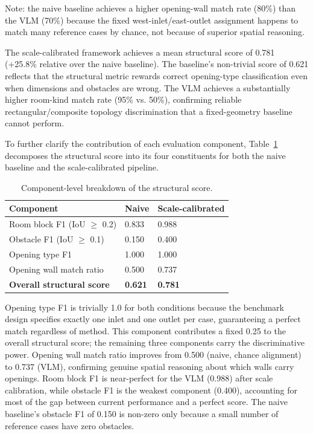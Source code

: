 \documentclass[preprint,12pt,number]{elsarticle}
\begin{document}
Note: the naive baseline achieves a higher opening-wall match rate (80\%) than the VLM (70\%) because the fixed west-inlet/east-outlet assignment happens to match many reference cases by chance, not because of superior spatial reasoning.

The scale-calibrated framework achieves a mean structural score of 0.781 (+25.8\% relative over the naive baseline). The baseline's non-trivial score of 0.621 reflects that the structural metric rewards correct opening-type classification even when dimensions and obstacles are wrong. The VLM achieves a substantially higher room-kind match rate (95\% vs. 50\%), confirming reliable rectangular/composite topology discrimination that a fixed-geometry baseline cannot perform.

To further clarify the contribution of each evaluation component, Table~\ref{tab:result-component-breakdown} decomposes the structural score into its four constituents for both the naive baseline and the scale-calibrated pipeline.

\begin{table}[htbp]
\centering
\caption{Component-level breakdown of the structural score.}
\label{tab:result-component-breakdown}
\begin{tabular}{lll}
\toprule
Component & Naive & Scale-calibrated \\
\midrule
Room block F1 (IoU $\geq$ 0.2) & 0.833 & 0.988 \\
Obstacle F1 (IoU $\geq$ 0.1) & 0.150 & 0.400 \\
Opening type F1 & 1.000 & 1.000 \\
Opening wall match ratio & 0.500 & 0.737 \\
\textbf{Overall structural score} & \textbf{0.621} & \textbf{0.781} \\
\bottomrule
\end{tabular}
\end{table}


Opening type F1 is trivially 1.0 for both conditions because the benchmark design specifies exactly one inlet and one outlet per case, guaranteeing a perfect match regardless of method. This component contributes a fixed 0.25 to the overall structural score; the remaining three components carry the discriminative power. Opening wall match ratio improves from 0.500 (naive, chance alignment) to 0.737 (VLM), confirming genuine spatial reasoning about which walls carry openings. Room block F1 is near-perfect for the VLM (0.988) after scale calibration, while obstacle F1 is the weakest component (0.400), accounting for most of the gap between current performance and a perfect score. The naive baseline's obstacle F1 of 0.150 is non-zero only because a small number of reference cases have zero obstacles.
\end{document}
